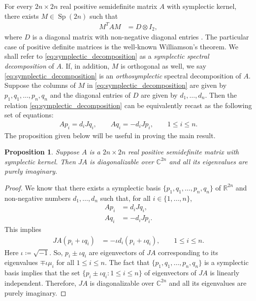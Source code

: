 \documentclass[preprint,12pt]{elsarticle}
\newtheorem{proposition}[theorem]{Proposition}
\begin{document}
    For every $2n \times 2n$ real positive semidefinite matrix $A$ with symplectic kernel, there exists $M \in \operatorname{Sp}(2n)$ such that
    \begin{align}\label{eq:symplectic_decomposition}
        M^T A M &= D \otimes I_2,
    \end{align}
    where $D$ is a diagonal matrix with non-negative diagonal entries \cite{jm, sonstykel}.
    The particular case of positive definite matrices is the well-known Williamson's theorem.
    We shall refer to \eqref{eq:symplectic_decomposition} as a \emph{symplectic spectral decomposition} of $A$.
    If, in addition, $M$ is orthogonal as well, we say \eqref{eq:symplectic_decomposition} is an \emph{orthosymplectic} spectral decomposition of $A$.
    Suppose the columns of $M$ in \eqref{eq:symplectic_decomposition} are given by $p_1, q_1,\ldots, p_n, q_n$ and the diagonal entries of $D$ are given by $d_1,\ldots, d_n$.
    Then the relation \eqref{eq:symplectic_decomposition} can be equivalently recast as the following set of equations:
    \begin{align}\label{eq:equivalence_symplectic_decompostion}
        A p_i = d_i J q_i, \qquad A q_i = -d_i J p_i, \qquad 1\leq i \leq n.
    \end{align}
    The proposition given below will be useful in proving the main result.
    {
    \begin{proposition}\label{prop:hamilton_map_diagonalizable_pure_im_eigenvalues}
    Suppose $A$ is a $2n \times 2n$ real positive semidefinite matrix with symplectic kernel.
    Then $JA$ is diagonalizable over $\mathds{C}^{2n}$ and all its eigenvalues are purely imaginary.
    \end{proposition}
    }
    \begin{proof}
        We know that there exists a symplectic basis $\{p_1,q_1,\ldots, p_n,q_n\}$ of $\mathds{R}^{2n}$ and non-negative numbers $d_1,\ldots, d_n$ such that, for all $i \in \{1,\ldots, n\}$,
        \begin{align}
        A p_i &= d_i J q_i, \\
        A q_i &= -d_i J p_i.
    \end{align}
    This implies
        \begin{align}
            JA (p_i + \iota q_i)
                &= -\iota d_i (p_i + \iota q_i), \qquad 1 \leq i \leq n.
        \end{align}
    Here $\iota \coloneqq \sqrt{-1}$.
    So, $p_i \pm \iota q_i$ are eigenvectors of $JA$ corresponding to its  eigenvalues $\mp \iota \mu_i$ for all $1 \leq i \leq n$.
    The fact that $\{p_1,q_1,\ldots, p_n, q_n\}$ is a symplectic basis implies that the set $\{p_i \pm \iota q_i: 1\leq i \leq n\}$ of eigenvectors of $JA$ is linearly independent.
    Therefore, $JA$ is diagonalizable over $\mathds{C}^{2n}$ and all its eigenvalues are purely imaginary.
    \end{proof}
\end{document}
